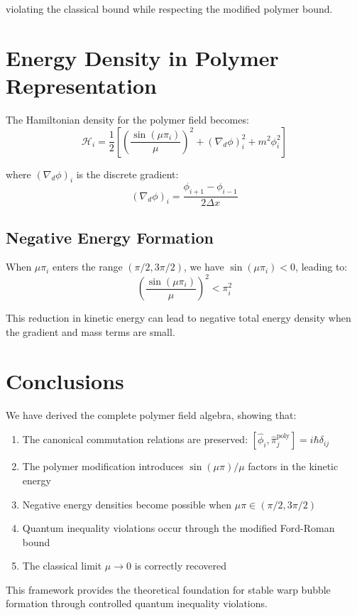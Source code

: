 \documentclass[12pt]{article}
\begin{document}
violating the classical bound while respecting the modified polymer bound.

\section{Energy Density in Polymer Representation}

The Hamiltonian density for the polymer field becomes:
\begin{equation}
\mathcal{H}_i = \frac{1}{2}\left[ \left(\frac{\sin(\mu \pi_i)}{\mu}\right)^2 + (\nabla_d \phi)_i^2 + m^2 \phi_i^2 \right]
\end{equation}

where $(\nabla_d \phi)_i$ is the discrete gradient:
\begin{equation}
(\nabla_d \phi)_i = \frac{\phi_{i+1} - \phi_{i-1}}{2\Delta x}
\end{equation}

\subsection{Negative Energy Formation}

When $\mu \pi_i$ enters the range $(\pi/2, 3\pi/2)$, we have $\sin(\mu \pi_i) < 0$, leading to:
\begin{equation}
\left(\frac{\sin(\mu \pi_i)}{\mu}\right)^2 < \pi_i^2
\end{equation}

This reduction in kinetic energy can lead to negative total energy density when the gradient and mass terms are small.

\section{Conclusions}

We have derived the complete polymer field algebra, showing that:
\begin{enumerate}
\item The canonical commutation relations are preserved: $[\hat{\phi}_i, \hat{\pi}_j^{\text{poly}}] = i\hbar\delta_{ij}$
\item The polymer modification introduces $\sin(\mu\pi)/\mu$ factors in the kinetic energy
\item Negative energy densities become possible when $\mu\pi \in (\pi/2, 3\pi/2)$
\item Quantum inequality violations occur through the modified Ford-Roman bound
\item The classical limit $\mu \to 0$ is correctly recovered
\end{enumerate}

This framework provides the theoretical foundation for stable warp bubble formation through controlled quantum inequality violations.
\end{document}

